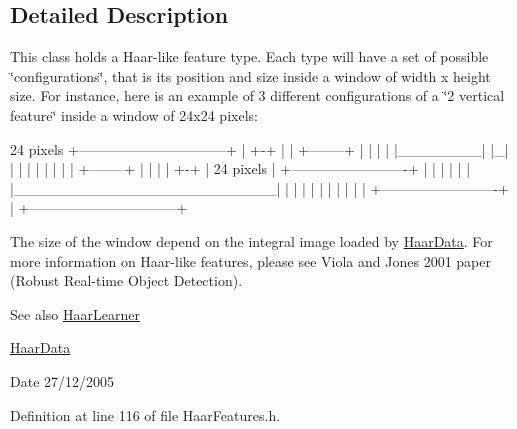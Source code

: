 \subsection{Detailed Description}
This class holds a Haar-\/like feature type. Each type will have a set of possible \char`\"{}configurations\char`\"{}, that is its position and size inside a window of width x height size. For instance, here is an example of 3 different configurations of a \char`\"{}2 vertical feature\char`\"{} inside a window of 24x24 pixels: \begin{DoxyVerb}
	 24 pixels
	 +--------------------------------+
	 |                   +-+          |
	 |   +--------+      | |          |
	 |   |________|      |_|          |
	 |   |        |      | |          |
	 |   +--------+      | |          |
	 |                   +-+          |  24 pixels
	 |    +-------------------------+ |
	 |    |                         | |
	 |    |_________________________| |
	 |    |                         | |
	 |    |                         | |
	 |    +-------------------------+ |
	 +--------------------------------+
	 \end{DoxyVerb}
 The size of the window depend on the integral image loaded by \hyperlink{classMultiBoost_1_1HaarData}{HaarData}. For more information on Haar-\/like features, please see Viola and Jones 2001 paper (Robust Real-\/time Object Detection). \begin{DoxySeeAlso}{See also}
\hyperlink{classMultiBoost_1_1HaarLearner}{HaarLearner} 

\hyperlink{classMultiBoost_1_1HaarData}{HaarData} 
\end{DoxySeeAlso}
\begin{DoxyDate}{Date}
27/12/2005 
\end{DoxyDate}


Definition at line 116 of file HaarFeatures.h.



